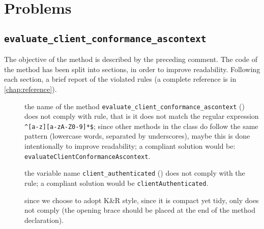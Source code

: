 \chapter{Problems}




\lipsum[1]


\section{\normalfont\texttt{evaluate\_client\_conformance\_ascontext}}

The objective of the method is described by the preceding comment. The code of the method has been split into sections, in order to improve readability. Following each section, a brief report of the violated rules (a complete reference is in \cref{chap:reference}).


\begin{description}
	
	\item []
		the name of the method \verb|evaluate_client_conformance_ascontext| () does not comply with rule, that is it does not match the regular expression \verb|^[a-z][a-zA-Z0-9]*$|; since other methods in the class do follow the same pattern (lowercase words, separated by underscores), maybe this is done intentionally to improve readability; a compliant solution would be: \texttt{evaluateClientConformanceAscontext}. %
	
	\item []
		the variable name \verb|client_authenticated| () does not comply with the rule; a compliant solution would be \verb|clientAuthenticated|. 
	
	\item []
		since we choose to adopt K\&R style, since it is compact yet tidy, only  does not comply (the opening brace should be placed at the end of the method declaration).
		
\end{description}

